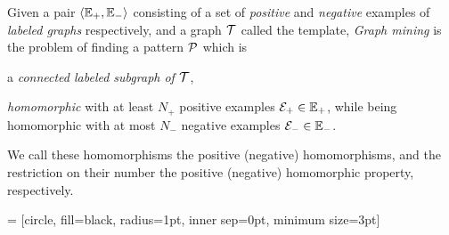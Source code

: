 \begin{definition}
\label{def:GM1}
Given a pair $\langle \mathbb{E}_{+},\mathbb{E}_{-} \rangle$ consisting of a set of \emph{positive} and \emph{negative} examples of \emph{labeled graphs} respectively, 
and a graph $\mathcal{T}$ called the template,
\emph{Graph mining} is the problem of finding a pattern $\mathcal{P}$ which is
\begin{compactitem}
\item a \emph{connected labeled subgraph of $\mathcal{T}$},
\item \emph{homomorphic} with at least $N_{+}$ positive examples $\mathcal{E}_{+} \in \mathbb{E}_{+}$, while being homomorphic with at most $N_{-}$ negative examples $\mathcal{E}_{-} \in \mathbb{E}_{-}$. 
\end{compactitem}
\end{definition}
We call these homomorphisms the positive (negative) homomorphisms, and the restriction on their number the positive (negative) homomorphic property, respectively.

 = [circle, fill=black, radius=1pt, inner sep=0pt, minimum size=3pt]


